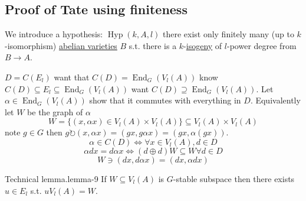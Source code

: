 \documentclass[10pt,]{book}
\numberwithin{equation}{section}
\newcommand{\acts}{\circlearrowright}
\DeclareMathOperator{\End}{End}
\begin{document}
\subsection[{Proof of Tate using finiteness}]{Proof of Tate using finiteness}\label{subsection-34}
\hypertarget{p-391}{}%
We introduce a hypothesis: \(\operatorname{Hyp}(k,A,l)\) there exist only finitely many (up to \(k\)-isomorphism) \hyperref[def-buntes-abvar]{abelian varieties} \(B\) s.t. there is a \(k\)-\hyperref[def-supersing-isog-isog]{isogeny} of \(l\)-power degree from \(B\to A\).%
\par
\hypertarget{p-392}{}%
\(D =C(E_l)\) want that \(C(D) = \End_G(V_l(A))\) know \(C(D) \subseteq E_l \subseteq \End_G(V_l(A))\) want \(C(D) \supseteq \End_G(V_l(A))\). Let \(\alpha \in \End_G(V_l(A))\) show that it commutes with everything in \(D\). Equivalently let \(W\) be the graph of \(\alpha\)%
\begin{equation*}
W = \{(x,\alpha x) \in V_l(A)\times V_l(A)\} \subseteq V_l(A)\times V_l(A)
\end{equation*}
note \(g\in G\) then \(g\acts (x,\alpha x) = (gx,g\alpha x ) = (gx, \alpha(gx))\).%
\begin{equation*}
\alpha\in C(D) \iff \forall x\in V_l(A), d\in D
\end{equation*}
%
\begin{equation*}
\alpha d x = d\alpha x \iff (d\oplus d)W \subseteq W \forall d\in D
\end{equation*}
%
\begin{equation*}
W\ni (dx, d\alpha x) = (dx, \alpha d x)
\end{equation*}
%
\begin{lemma}{Technical lemma.}{}{lemma-9}%
\hypertarget{p-393}{}%
If \(W\subseteq V_l(A)\) is \(G\)-stable subspace then there exists \(u\in E_l\) s.t. \(u V_l(A) = W\).%
\end{lemma}
\end{document}
